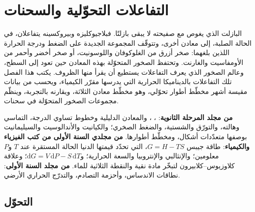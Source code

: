\chapter{التفاعلات التحوّلية والسحنات}\label{ch:b2:metamorphic-facies}

البازلت الذي يغوص مع صفيحته لا يبقى بازلتًا. فبلاجيوكليزه وبيروكسينه
يتفاعلان، في الحالة الصلبة، إلى معادن أخرى، وتتوقّف المجموعة الجديدة على
الضغط ودرجة الحرارة اللذين بلغهما: صخر أزرق من الغلوكوفان واللوسونيت، أو
صخر أخضر وأحمر من الأومفاسيت والغارنت. وتحتفظ الصخور المتحوّلة بهذه المعادن حين
تعود إلى السطح، وعالم الصخور الذي يعرف التفاعلات يستطيع أن يقرأ منها
الظروف. يكتب هذا الفصل تلك التفاعلات بالديناميكا الحرارية التي يدرسها
مقرّر الكيمياء، ويحسب من بيانات مقيسة أشهر مخطّط أطوار تحوّلي،
وهو مخطّط معادن  الثلاثة، ويقارنه بالتجربة، وينظّم
مجموعات الصخور المتحوّلة في سحنات.

\begin{recall}
\textbf{من مجلد المرحلة الثانوية}: ، ، والمعادن الدليلية
وخطوط تساوي الدرجة،  التماسي وهالته، والتورّق والشستية،
والضغط الصخري؛ والكيانيت والأندالوسيت والسيليمانيت بوصفها متعدّدات أشكال، ومخطّط
أطوارها. \textbf{من مجلدي السنة الأولى من كتب الفيزياء والكيمياء}: طاقة
جيبس $G = H - TS$، التي تحدّد قيمتها الدنيا الحالة المستقرة عند $T$ و$P$ معلومين؛
والإنثالبي والإنتروبيا والسعة الحرارية؛ و$\mathrm dG = V\,\mathrm dP - S\,\mathrm dT$؛
وعلاقة كلاوزيوس--كلابيرون لتبخّر مادة نقية والنقطة
الثلاثية للماء. \textbf{من مجلد السنة الأولى}: نطاقات الاندساس، وأحزمة التصادم،
والتدرّج الحراري الأرضي.
\end{recall}

\section{التحوّل}\label{sec:b2:metamorphic-facies:metamorphism}

